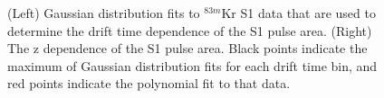\documentclass[a4paper,12pt]{article}
\begin{document}
{%
\begin{figure} 
\centering
{}
\qquad
{}
\caption{ (Left) Gaussian distribution fits to $^{83m}$Kr S1 data that are used to determine the drift time dependence of the S1 pulse area. (Right) The z dependence of the S1 pulse area. Black points indicate the maximum of Gaussian distribution fits for each drift time bin, and red points indicate the polynomial fit to that data.}
\label{fig:KrypCal_S1ZDep}
\end{figure}

}
\end{document}
